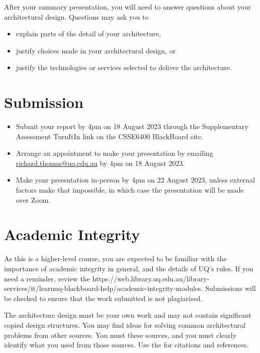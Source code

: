\documentclass{csse4400}
\begin{document}
After your summary presentation, you will need to answer questions about your architectural design.
Questions may ask you to
\begin{itemize}
	\item explain parts of the detail of your architecture,
	\item justify choices made in your architectural design, or
	\item justify the technologies or services selected to deliver the architecture.
\end{itemize}


\section{Submission}
\begin{itemize}
	\item Submit your report by 4pm on 18 August 2023 through the Supplementary Assessment TurnItIn link on the CSSE6400 BlackBoard site.
	\item Arrange an appointment to make your presentation by emailing \href{mailto:richard.thomas@uq.edu.au}{richard.thomas@uq.edu.au} by 4pm on 18 August 2023.
	\item Make your presentation in-person by 4pm on 22 August 2023, unless external factors make that impossible, in which case the presentation will be made over Zoom.
\end{itemize}


\section{Academic Integrity}
As this is a higher-level course, you are expected to be familiar with the importance of academic integrity in general, and the details of UQ's rules.
If you need a reminder, review the 
{https://web.library.uq.edu.au/library-services/it/learnuq-blackboard-help/academic-integrity-modules}.
Submissions will be checked to ensure that the work submitted is not plagiarised.

The architecture design must be your own work and may not contain significant copied design structures.
You may find ideas for solving common architectural problems from other sources.
You must  these sources, and you must clearly identify what you used from those sources.
Use the  for citations and references.
\end{document}

